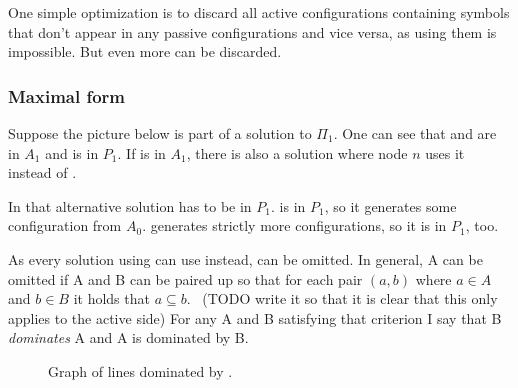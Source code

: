 \documentclass[english, 12pt, a4paper, sci, a-1b, online]{aaltothesis}
\begin{document}
One simple optimization is to discard all active configurations containing symbols that don't appear in any passive configurations and vice versa, as using them is impossible. But even more can be discarded.

\subsubsection{Maximal form}

Suppose the picture below is part of a solution to $\Pi_{1}$. One can see that  and  are in $A_{1}$ and  is in $P_{1}$. If  is in $A_{1}$, there is also a solution where node $n$ uses it instead of .


In that alternative solution  has to be in $P_{1}$.  is in $P_{1}$, so it generates some configuration from $A_{0}$.  generates strictly more configurations, so it is in $P_{1}$, too.

As every solution using  can use  instead,  can be omitted. In general, A can be omitted if A and B can be paired up so that for each pair $(a, b)$ where $a \in A$ and $b \in B$ it holds that $a \subseteq b$.~\cite{DA2020} (TODO write it so that it is clear that this only applies to the active side) For any A and B satisfying that criterion I say that B \emph{dominates} A and A is dominated by B.

\begin{figure}[h]
  \centering
  \caption{Graph of lines dominated by .}
\end{figure}
\end{document}
